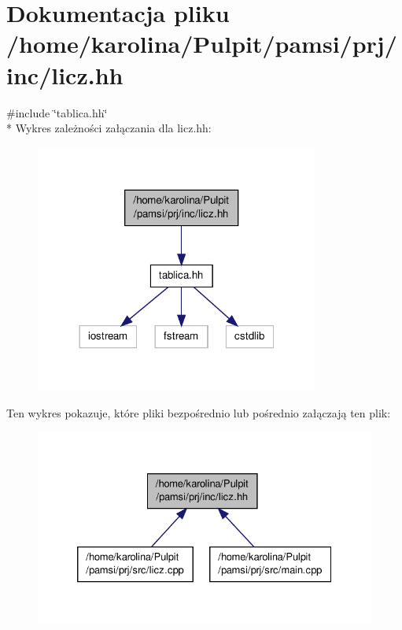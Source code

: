\hypertarget{licz_8hh}{\section{Dokumentacja pliku /home/karolina/\-Pulpit/pamsi/prj/inc/licz.hh}
\label{licz_8hh}
}
{\ttfamily \#include \char`\"{}tablica.\-hh\char`\"{}}\\*
Wykres zależności załączania dla licz.\-hh\-:
\nopagebreak
\begin{figure}[H]
\begin{center}
\leavevmode
\includegraphics[width=264pt]{licz_8hh__incl}
\end{center}
\end{figure}
Ten wykres pokazuje, które pliki bezpośrednio lub pośrednio załączają ten plik\-:
\nopagebreak
\begin{figure}[H]
\begin{center}
\leavevmode
\includegraphics[width=328pt]{licz_8hh__dep__incl}
\end{center}
\end{figure}
